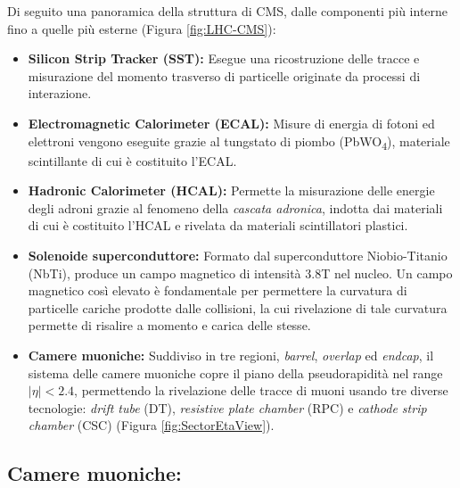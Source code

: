 Di seguito una panoramica della struttura di CMS, dalle componenti più interne fino a quelle più esterne \cite{MasterThesisNicLai}(Figura \ref{fig:LHC-CMS}):

\begin{itemize}
  \item \textbf{Silicon Strip Tracker (SST):} Esegue una ricostruzione delle tracce e misurazione del momento trasverso di particelle originate da processi di interazione. 
  \item \textbf{Electromagnetic Calorimeter (ECAL):} Misure di energia di fotoni ed elettroni vengono eseguite grazie al tungstato di piombo (\si{PbWO_4}), materiale scintillante di cui è costituito l'ECAL.
  \item \textbf{Hadronic Calorimeter (HCAL):} Permette la misurazione delle energie degli adroni grazie al fenomeno della \textit{cascata adronica}, indotta dai materiali di cui è costituito l'HCAL e rivelata da materiali scintillatori plastici.
  \item \textbf{Solenoide superconduttore:} Formato dal superconduttore Niobio-Titanio (NbTi), produce un campo magnetico di intensità 3.8T nel nucleo. Un campo magnetico così elevato è fondamentale per permettere la curvatura di particelle cariche prodotte dalle collisioni, la cui rivelazione di tale curvatura permette di risalire a momento e carica delle stesse.
  \item \textbf{Camere muoniche:} Suddiviso in tre regioni, \textit{barrel}, \textit{overlap} ed \textit{endcap}, il sistema delle camere muoniche copre il piano della pseudorapidità nel range $|\eta| < 2.4$, permettendo la rivelazione delle tracce di muoni usando tre diverse tecnologie: \textit{drift tube} (DT), \textit{resistive plate chamber} (RPC) e \textit{cathode strip chamber} (CSC) \cite{TheMuonProject} (Figura \ref{fig:SectorEtaView}).
\end{itemize}


\subsection{Camere muoniche:}

